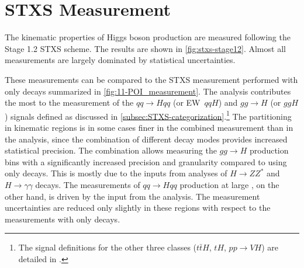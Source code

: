 \section{STXS Measurement}
The kinematic properties of Higgs boson production are measured following the Stage 1.2 STXS scheme. 
The results are shown in \cref{fig:stxs-stage12}. 
Almost all measurements are largely dominated by statistical uncertainties. 

These measurements can be compared to the STXS measurement performed with only \HWW decays summarized in \cref{fig:11-POI_measurement}. 
The \HWW analysis contributes the most to the measurement of the $qq\to Hqq$ (or EW~$qqH$) and $gg \to H$ (or $ggH$) signals defined as discussed in \cref{subsec:STXS-categorization}.\footnote{The signal definitions for the other three classes ($t\bar{t}H$, $tH$, $pp\to VH$) are detailed in .}
The partitioning in kinematic regions is in some cases finer in the combined measurement than in the \HWW analysis, since the combination of different decay modes provides increased statistical precision.
The combination allows measuring the $gg \to H$ production bins with a significantly increased precision and granularity compared to using only \HWW decays. 
This is mostly due to the inputs from analyses of $H \to ZZ^*$ and $H \to \gamma\gamma$ decays.
The measurements of $qq\to Hqq$ production at large \mjj, on the other hand, is driven by the input from the \HWW analysis. The measurement uncertainties are reduced only slightly in these regions with respect to the measurements with only \HWW decays.


